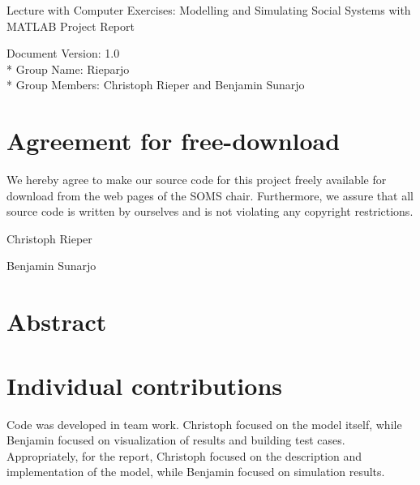 \documentclass[a4paper, DIV11, abstracton]{scrartcl}
\begin{document}
\thispagestyle{empty}




Lecture with Computer Exercises: Modelling and Simulating Social Systems with MATLAB
Project Report

Document Version: 1.0\\*
Group Name: Rieparjo\\*
Group Members: Christoph Rieper and Benjamin Sunarjo



\newpage
\setcounter{page}{1}
\section*{Agreement for free-download}

We hereby agree to make our source code for this project freely available for download from the web pages of the SOMS chair. Furthermore, we assure that all source code is written by ourselves and is not violating any copyright restrictions.

\bigskip
Christoph Rieper

\bigskip
Benjamin Sunarjo

\newpage


\tableofcontents

\newpage
\setcounter{page}{1}	%
\pagestyle{plain}
\section*{Abstract}

\section*{Individual contributions}
Code was developed in team work. Christoph focused on the model itself, while Benjamin focused on visualization of results and building test cases. Appropriately, for the report, Christoph focused on the description and implementation of the model, while Benjamin focused on simulation results.
\end{document}

